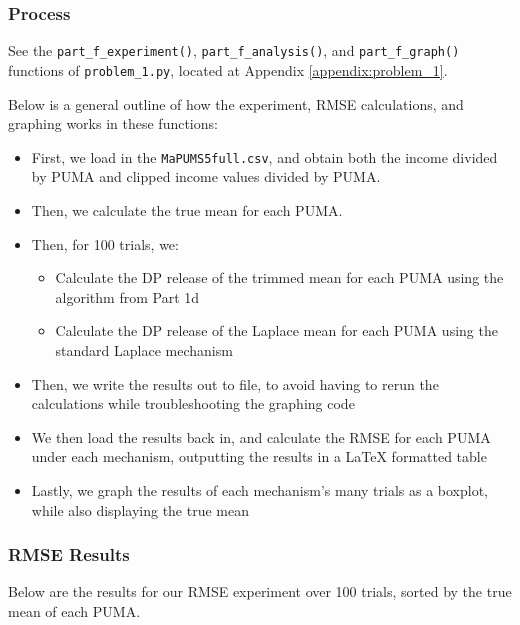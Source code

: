 \documentclass[12pt]{article}
\def\cl{\lstinline}
\begin{document}
\subsubsection{Process}

See the \cl{part_f_experiment()}, \cl{part_f_analysis()}, and \cl{part_f_graph()} functions of \cl{problem_1.py}, located at Appendix \ref{appendix:problem_1}.

\bigskip

Below is a general outline of how the experiment, RMSE calculations, and graphing works in these functions:

\begin{itemize}
  \item First, we load in the \cl{MaPUMS5full.csv}, and obtain both the income divided by PUMA and clipped income values divided by PUMA.
  \item Then, we calculate the true mean for each PUMA.
  \item Then, for 100 trials, we:
  \begin{itemize}
    \item Calculate the DP release of the trimmed mean for each PUMA using the algorithm from Part 1d
    \item Calculate the DP release of the Laplace mean for each PUMA using the standard Laplace mechanism
  \end{itemize}
  \item Then, we write the results out to file, to avoid having to rerun the calculations while troubleshooting the graphing code
  \item We then load the results back in, and calculate the RMSE for each PUMA under each mechanism, outputting the results in a LaTeX formatted table
  \item Lastly, we graph the results of each mechanism's many trials as a boxplot, while also displaying the true mean
\end{itemize}

\subsubsection{RMSE Results}

Below are the results for our RMSE experiment over 100 trials, sorted by the true mean of each PUMA.
\end{document}
